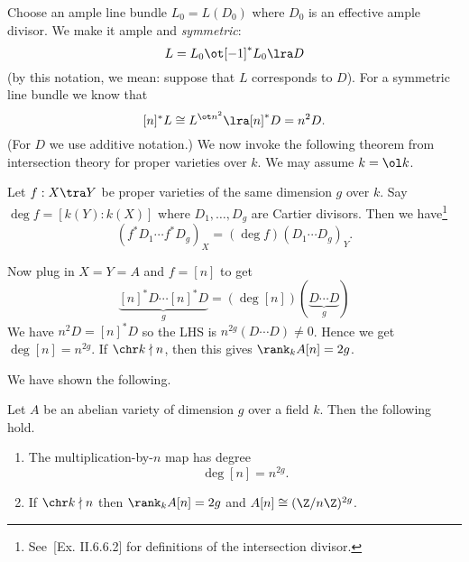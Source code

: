 Choose an ample line bundle $L_0=L(D_0)$ where $D_0$ is an effective ample divisor. We make it ample and {\it symmetric}:
\[
L=L_0\ot [-1]^*L_0\lra D
\]
(by this notation, we mean: suppose that $L$ corresponds to $D$). For a symmetric line bundle we know that
\[
[n]^*L\cong L^{\ot n^2}\lra [n]^*D=n^2D.
\]
(For $D$ we use additive notation.)
We now invoke the following theorem from intersection theory for proper varieties over $k$. We may assume $k=\ol k$. 
\begin{fct}
Let $f:X\tra Y$ be proper varieties of the same dimension $g$ over $k$. Say $\deg f=[k(Y): k(X)]$ where $D_1,\ldots, D_g$ are Cartier divisors. Then we have\footnote{See~\cite{Ha77}[Ex. II.6.6.2] for definitions of the intersection divisor.} %
\[
(f^*D_1\cdots f^*D_g)_X=(\deg f)(D_1\cdots D_g)_Y.
\]
\end{fct}
Now plug in $X=Y=A$ and $f=[n]$ to get
\[
\underbrace{[n]^*D\cdots [n]^*D}_g=(\deg[n])(\underbrace{D\cdots D}_g)
\]%
We have $n^2D=[n]^*D$ so the LHS is $n^{2g} (D\cdots D)\ne 0$. Hence we get $\deg[n]=n^{2g}$. If $\chr k\nmid n$, then this gives $\rank_kA[n]=2g$.

We have shown the following.
\begin{thm}
Let $A$ be an abelian variety of dimension $g$ over a field $k$. Then the following hold.
\begin{enumerate}
\item
The multiplication-by-$n$ map has degree
\[
\deg[n]=n^{2g}.
\]
\item
If $\chr k\nmid n$ then $\rank_kA[n]=2g$ and $A[n]\cong (\Z/n\Z)^{2g}$.
\end{enumerate}
\end{thm}
